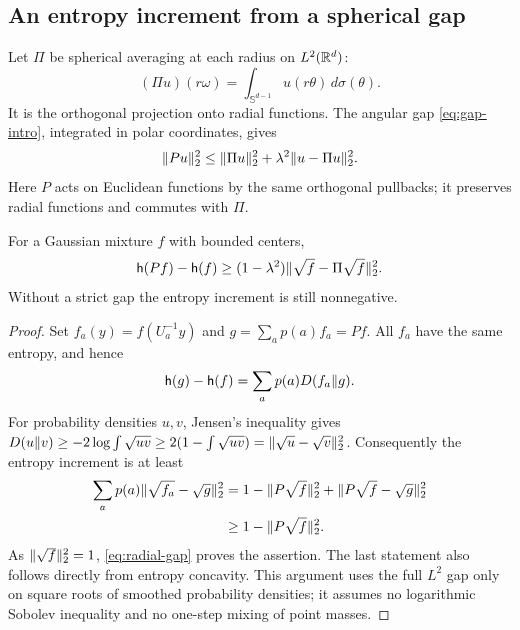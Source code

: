 \subsection{An entropy increment from a spherical gap}
Let $\Pi$ be spherical averaging at each radius on $L^2(\mathbb R^d)$:
\[
 (\Pi u)(r\omega)=\int_{\mathbb S^{d-1}}u(r\theta)\,d\sigma(\theta).
\]
It is the orthogonal projection onto radial functions. The angular gap
\eqref{eq:gap-intro}, integrated in polar coordinates, gives
\begin{equation}\label{eq:radial-gap}
 \lVert Pu\rVert_2^2\le\lVert\Pi u\rVert_2^2
                  +\lambda^2\lVert u-\Pi u\rVert_2^2.
\end{equation}
Here $P$ acts on Euclidean functions by the same orthogonal pullbacks;
it preserves radial functions and commutes with $\Pi$.

\begin{lemma}
\label{lem:entropy-gap}
For a Gaussian mixture $f$ with bounded centers,
\begin{equation}\label{eq:entropy-gap}
 \mathsf h(Pf)-\mathsf h(f)
 \ge (1-\lambda^2)\lVert\sqrt f-\Pi\sqrt f\rVert_2^2.
\end{equation}
Without a strict gap the entropy increment is still nonnegative.
\end{lemma}
\begin{proof}
Set $f_a(y)=f(U_a^{-1}y)$ and $g=\sum_ap(a)f_a=Pf$.
All $f_a$ have the same entropy, and hence
\[
 \mathsf h(g)-\mathsf h(f)=\sum_ap(a)D(f_a\Vert g).
\]
For probability densities $u,v$, Jensen's inequality gives
$D(u\Vert v)\ge-2\log\int\sqrt{uv}
\ge2(1-\int\sqrt{uv})=\lVert\sqrt u-\sqrt v\rVert_2^2$.
Consequently the entropy increment is at least
\begin{align*}
 \sum_ap(a)\lVert\sqrt{f_a}-\sqrt g\rVert_2^2
 &=1-\lVert P\sqrt f\rVert_2^2
       +\lVert P\sqrt f-\sqrt g\rVert_2^2\\
 &\ge1-\lVert P\sqrt f\rVert_2^2.
\end{align*}
As $\lVert\sqrt f\rVert_2^2=1$, \eqref{eq:radial-gap} proves the assertion.
The last statement also follows directly from entropy concavity. This
argument uses the full $L^2$ gap only on square roots of smoothed
probability densities; it assumes no logarithmic Sobolev inequality and
no one-step mixing of point masses.
\end{proof}
